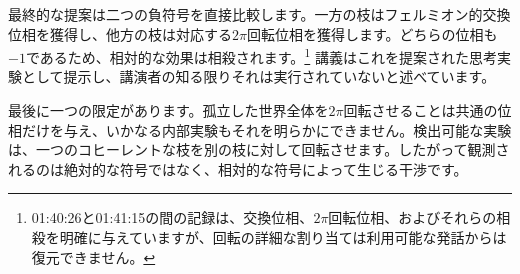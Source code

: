 最終的な提案は二つの負符号を直接比較します。一方の枝はフェルミオン的交換位相を獲得し、他方の枝は対応する\(2\pi\)回転位相を獲得します。どちらの位相も\(-1\)であるため、相対的な効果は相殺されます。\footnote{01:40:26と01:41:15の間の記録は、交換位相、\(2\pi\)回転位相、およびそれらの相殺を明確に与えていますが、回転の詳細な割り当ては利用可能な発話からは復元できません。} 講義はこれを提案された思考実験として提示し、講演者の知る限りそれは実行されていないと述べています。

\begin{classroomqa}
\end{classroomqa}

最後に一つの限定があります。孤立した世界全体を\(2\pi\)回転させることは共通の位相だけを与え、いかなる内部実験もそれを明らかにできません。検出可能な実験は、一つのコヒーレントな枝を別の枝に対して回転させます。したがって観測されるのは絶対的な符号ではなく、相対的な符号によって生じる干渉です。
